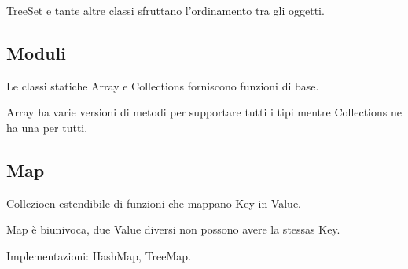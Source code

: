 TreeSet e tante altre classi sfruttano l'ordinamento tra gli oggetti.

\subsection{Moduli}
Le classi statiche Array e Collections forniscono funzioni di base.

Array ha varie versioni di metodi per supportare tutti i tipi mentre Collections ne ha una per tutti.

\subsection{Map}
Collezioen estendibile di funzioni che mappano  Key in Value.


Map è biunivoca, due Value diversi non possono avere la stessas Key.

Implementazioni: HashMap, TreeMap.